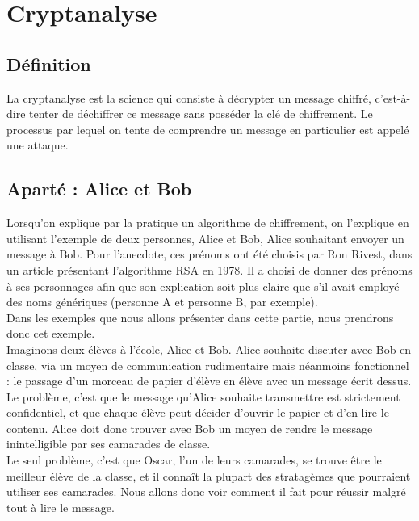 \chapter{Cryptanalyse}
	\section{Définition}
		La cryptanalyse est la science qui consiste à décrypter un message chiffré, c’est-à-dire tenter de déchiffrer ce message sans posséder la clé de chiffrement. Le processus par lequel on tente de comprendre un message en particulier est appelé une attaque.
	\section{Aparté : Alice et Bob}
		Lorsqu'on explique par la pratique un algorithme de chiffrement, on l'explique en utilisant l'exemple de deux personnes, Alice et Bob, Alice souhaitant envoyer un message à Bob. Pour l'anecdote, ces prénoms ont été choisis par Ron Rivest, dans un article présentant l'algorithme RSA en 1978. Il a choisi de donner des prénoms à ses personnages afin que son explication soit plus claire que s'il avait employé des noms génériques (personne A et personne B, par exemple).\\
		Dans les exemples que nous allons présenter dans cette partie, nous prendrons donc cet exemple.\\
		Imaginons deux élèves à l'école, Alice et Bob. Alice souhaite discuter avec Bob en classe, via un moyen de communication rudimentaire mais néanmoins fonctionnel : le passage d'un morceau de papier d'élève en élève avec un message écrit dessus. Le problème, c'est que le message qu'Alice souhaite transmettre est strictement confidentiel, et que chaque élève peut décider d'ouvrir le papier et d'en lire le contenu. Alice doit donc trouver avec Bob un moyen de rendre le message inintelligible par ses camarades de classe.\\
		Le seul problème, c'est que Oscar, l'un de leurs camarades, se trouve être le meilleur élève de la classe, et il connaît la plupart des stratagèmes que pourraient utiliser ses camarades. Nous allons donc voir comment il fait pour réussir malgré tout à lire le message.

